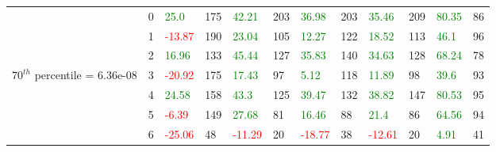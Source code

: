 \begin{table}[htb!]
\begin{adjustwidth}{-0.9in}{-0.9in}
\begin{tabular}{|p{5em}|p{2em}|p{3em}|p{3em}|p{3em}|p{3em}|p{3em}|p{3em}|p{3em}|p{3em}|p{3em}|p{3em}|}
            & 0 & \textcolor{green}{25.0} & 175 & \textcolor{green}{42.21} & 203 & \textcolor{green}{36.98} & 203 & \textcolor{green}{35.46} & 209 & \textcolor{green}{80.35} & 86\\\cline{3-12}
            & 1 & \textcolor{red}{-13.87} & 190 & \textcolor{green}{23.04} & 105 & \textcolor{green}{12.27} & 122 & \textcolor{green}{18.52} & 113 & \textcolor{green}{46.1} & 96\\\cline{3-12}
            & 2 & \textcolor{green}{16.96} & 133 & \textcolor{green}{45.44} & 127 & \textcolor{green}{35.83} & 140 & \textcolor{green}{34.63} & 128 & \textcolor{green}{68.24} & 78\\\cline{3-12}
            $70^{th}$ percentile = 6.36e-08 & 3 & \textcolor{red}{-20.92} & 175 & \textcolor{green}{17.43} & 97 & \textcolor{green}{5.12} & 118 & \textcolor{green}{11.89} & 98 & \textcolor{green}{39.6} & 93\\[-5.5ex]\cline{3-12}
            & 4 & \textcolor{green}{24.58} & 158 & \textcolor{green}{43.3} & 125 & \textcolor{green}{39.47} & 132 & \textcolor{green}{38.82} & 147 & \textcolor{green}{80.53} & 95\\\cline{3-12}
            & 5 & \textcolor{red}{-6.39} & 149 & \textcolor{green}{27.68} & 81 & \textcolor{green}{16.46} & 88 & \textcolor{green}{21.4} & 86 & \textcolor{green}{64.56} & 94\\\cline{3-12}
            & 6 & \textcolor{red}{-25.06} & 48 & \textcolor{red}{-11.29} & 20 & \textcolor{red}{-18.77} & 38 & \textcolor{red}{-12.61} & 20 & \textcolor{green}{4.91} & 41\\\hline\hline
            

\end{tabular}
\end{adjustwidth}
\end{table}
